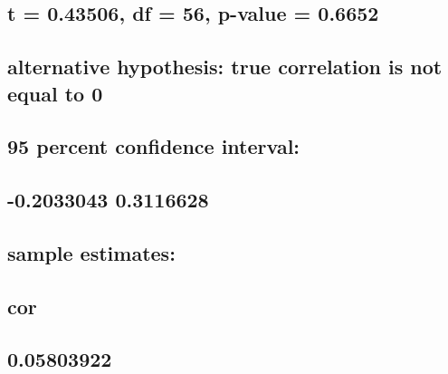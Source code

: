 \documentclass[
  12pt,
]{article}
\begin{document}
\hypertarget{t-0.43506-df-56-p-value-0.6652}{%
\subsection{t = 0.43506, df = 56, p-value =
0.6652}\label{t-0.43506-df-56-p-value-0.6652}}

\hypertarget{alternative-hypothesis-true-correlation-is-not-equal-to-0-9}{%
\subsection{alternative hypothesis: true correlation is not equal to
0}\label{alternative-hypothesis-true-correlation-is-not-equal-to-0-9}}

\hypertarget{percent-confidence-interval-9}{%
\subsection{95 percent confidence
interval:}\label{percent-confidence-interval-9}}

\hypertarget{section-92}{%
\subsection{-0.2033043 0.3116628}\label{section-92}}

\hypertarget{sample-estimates-9}{%
\subsection{sample estimates:}\label{sample-estimates-9}}

\hypertarget{cor-9}{%
\subsection{cor}\label{cor-9}}

\hypertarget{section-93}{%
\subsection{0.05803922}\label{section-93}}

\begin{verbatim}
\end{verbatim}

\hypertarget{section-94}{%
\subsection{}\label{section-94}}
\end{document}
